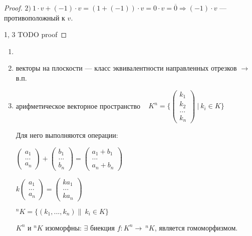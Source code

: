 \begin{proof} 
    $2)\ 1\cdot v+(-1)\cdot v=(1+(-1))\cdot v=0\cdot 
v=\overline{0}\Rightarrow (-1)\cdot v$ — противоположный к $v$.
    
    1, 3 TODO proof
\end{proof}
\begin{example}
\begin{enumerate}
    \item[]
    \item векторы на плоскости — класс эквивалентности направленных 
отрезков $\rightarrow$ в.п.
    \item арифметическое векторное пространство  
$K^n=\bigg\{\begin{pmatrix}
    k_1\\ k_2 \\...\\ k_n
    \end{pmatrix}\ \bigg |\ k_i\in K\bigg\}$

    Для него выполняются операции:

    $\begin{pmatrix}
        a_1\\...\\ a_n 
    \end{pmatrix}+\begin{pmatrix}
        b_1\\...\\ b_n
    \end{pmatrix}=\begin{pmatrix}
    a_1+b_1\\...\\ a_n+b_n
    \end{pmatrix}$
    
    $k\begin{pmatrix}
        a_1\\...\\ a_n
    \end{pmatrix}=\begin{pmatrix}
        ka_1\\...\\ ka_n
    \end{pmatrix}$
    
    $^nK=\{(k_1,...,k_n)\|\ k_i\in K\}$
    
    $K^n$ и $^nK$ изоморфны: $\exists$ биекция $f:K^n\rightarrow\  ^nK$, 
является гомоморфизмом.
    
\end{enumerate}
\end{example}

